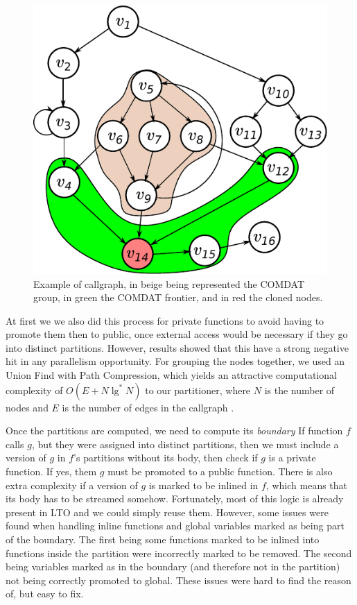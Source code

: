 \documentclass[runningheads]{llncs}
\begin{document}
\begin{figure}
\centering
	 \includegraphics[scale=0.8]{figuras/comdat_frontier.pdf}
	  \caption{Example of callgraph, in beige being represented the COMDAT group,
	  in green the COMDAT frontier, and in red the cloned nodes.}
	  \label{fig:comdat_frontier}
\end{figure}

At first we we also did this process for private functions to avoid having to
promote them then to public, once external access would be necessary if they go
into distinct partitions. However, results showed that this have a strong
negative hit in any parallelism opportunity. For grouping the nodes together,
we used an Union Find with Path Compression, which yields an attractive
computational complexity of $O(E + N \lg^*N)$ to our partitioner, where $N$ is the
number of nodes and $E$ is the number of edges in the callgraph \cite{feufiloff}.

Once the partitions are computed, we need to compute its \textit{boundary}
If function $f$ calls $g$, but they were assigned into distinct partitions,
then we must include a version of $g$ in $f$'s partitions without its body,
then check if $g$ is a private function. If yes, them $g$ must be promoted
to a public function. There is also extra complexity if a version of $g$
is marked to be inlined in $f$, which means that its body has to be
streamed somehow. Fortunately, most of this logic is already present
in LTO and we could simply reuse them. However, some issues were found
when handling inline functions and global variables marked as being part
of the boundary. The first being some functions marked to be inlined into 
functions inside the partition were incorrectly marked to be removed.
The second being variables marked as in the boundary (and therefore
not in the partition) not being correctly promoted to global. These issues
were hard to find the reason of, but easy to fix.
\end{document}
